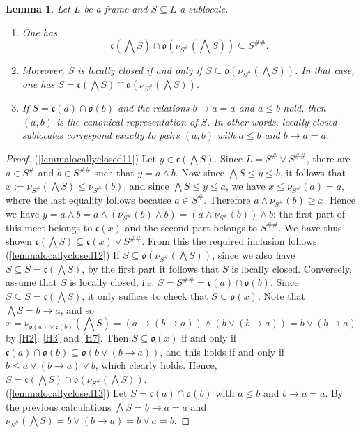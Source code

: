 \documentclass[11pt,a4paper,reqno]{amsart}
\newcommand{\tbigwedge}{\mathop{\textstyle \bigwedge }}%
\def\cl{\mathfrak{c}}
\def\op{\mathfrak{o}}
\newtheorem{lemma}[theorem]{Lemma}
\theoremstyle{definition}
\theoremstyle{remark}
\begin{document}
{\begin{lemma}\label{lemmalocallyclosed1}Let $L$ be a frame and $S\subseteq L$ a sublocale. 
\begin{enumerate}
\item\label{lemmalocallyclosed11} One has $$\cl(\tbigwedge S)\cap \op(\nu_{S^\#}(\tbigwedge S))\subseteq S^{\#\#}.$$
\item\label{lemmalocallyclosed12}  Moreover, $S$ is locally closed if and only if $S\subseteq \op(\nu_{S^\#}(\tbigwedge S))$.  In that case, one has $S= \cl(\tbigwedge S)\cap \op(\nu_{S^\#}(\tbigwedge S))$.
\item\label{lemmalocallyclosed13}  If $S=\cl(a)\cap \op(b)$ and the relations $b\to a=a$ and $a\leq b$ hold, then  $(a,b)$ is the canonical representation of $S$. In other words, locally closed sublocales correspond exactly to pairs $(a,b)$ with $a\leq b$ and $b\to a = a$.
\end{enumerate}
\end{lemma}

\begin{proof}
(\ref{lemmalocallyclosed11}) Let $y\in \cl(\bigwedge S)$. Since $L=S^\#\vee S^{\#\#}$,  there  are $a\in S^\#$ and $b\in S^{\#\#}$ such that $y=a\wedge b$. Now since $\bigwedge S\leq y\leq b$, it follows that $x:= \nu_{S^\#}(\tbigwedge S) \leq \nu_{S^\#}(b)$, and since $\bigwedge S\leq y\leq a$, we  have $x\leq \nu_{S^\#}(a)=a$, where the last equality follows because $a\in S^\#$. Therefore $a\wedge \nu_{S^\#}(b)\geq x$. Hence we have $y= a\wedge b = a\wedge ( \nu_{S^\#}(b)\wedge b) =(a\wedge \nu_{S^\#}(b))\wedge b$: the first part of this meet belongs to $\cl(x)$ and the second part belongs to $S^{\#\#}$. We have thus shown $\cl(\bigwedge S)\subseteq \cl(x)\vee S^{\#\#}$. From this the required inclusion follows.\\[2mm]
(\ref{lemmalocallyclosed12}) If $S\subseteq \op(\nu_{S^\#}(\tbigwedge S))$, since we also have $S\subseteq \overline{S}= \cl(\tbigwedge S)$, by the first part it follows that  $S$ is locally closed.  Conversely, assume that $S$ is locally closed, i.e. $S=S^{\#\#}=\cl(a)\cap \op(b)$. Since $S\subseteq \overline{S}=\cl(\tbigwedge S)$, it only suffices to check that $S\subseteq \op(x)$. Note that $\tbigwedge S= b\to a$, and so $$x=\nu_{\op(a)\vee\cl(b)}(\tbigwedge S) =(a\to (b\to a))\wedge (b\vee(b\to a))= b\vee (b\to a)$$ by \ref{H2}, \ref{H3} and \ref{H7}. Then $S\subseteq \op(x)$ if and only if $\cl(a)\cap\op(b)\subseteq \op(b\vee (b\to a))$, and this holds if and only if $b\leq a\vee (b\to a)\vee b$, which clearly holds. Hence, $S=  \cl(\tbigwedge S)\cap \op(\nu_{S^\#}(\tbigwedge S))$.\\[2mm]
(\ref{lemmalocallyclosed13}) Let $S=\cl(a)\cap \op(b)$ with $a\leq b$ and $b\to a=a$. By the previous calculations $\tbigwedge S= b\to a = a$ and $\nu_{S^\#}(\tbigwedge S)=b\vee (b\to a)=b\vee a= b$. 
\end{proof}

}
\end{document}
